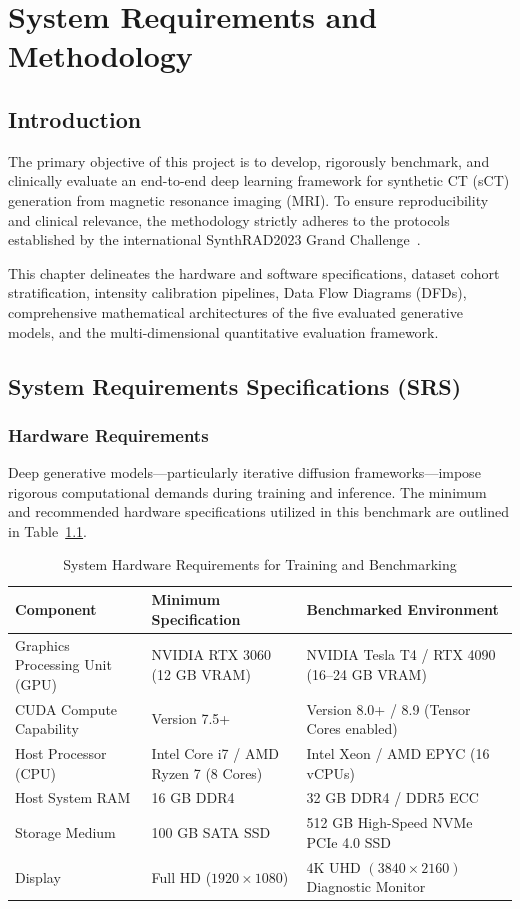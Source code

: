 \chapter{System Requirements and Methodology}

\section{Introduction}
The primary objective of this project is to develop, rigorously benchmark, and clinically evaluate an end-to-end deep learning framework for synthetic CT (sCT) generation from magnetic resonance imaging (MRI). To ensure reproducibility and clinical relevance, the methodology strictly adheres to the protocols established by the international SynthRAD2023 Grand Challenge~\cite{thummerer2023synthrad2023}. 

This chapter delineates the hardware and software specifications, dataset cohort stratification, intensity calibration pipelines, Data Flow Diagrams (DFDs), comprehensive mathematical architectures of the five evaluated generative models, and the multi-dimensional quantitative evaluation framework.

\section{System Requirements Specifications (SRS)}

\subsection{Hardware Requirements}
Deep generative models—particularly iterative diffusion frameworks—impose rigorous computational demands during training and inference. The minimum and recommended hardware specifications utilized in this benchmark are outlined in Table~\ref{tab:hardware_req}.

\begin{table}[htbp]
\centering
\caption{System Hardware Requirements for Training and Benchmarking}
\label{tab:hardware_req}
\small
\renewcommand{\arraystretch}{1.3}
\begin{tabularx}{\textwidth}{@{} l p{5.5cm} X @{}}
\toprule
\textbf{Component} & \textbf{Minimum Specification} & \textbf{Benchmarked Environment} \\
\midrule
Graphics Processing Unit (GPU) & NVIDIA RTX 3060 (12 GB VRAM) & NVIDIA Tesla T4 / RTX 4090 (16--24 GB VRAM) \\
CUDA Compute Capability & Version 7.5+ & Version 8.0+ / 8.9 (Tensor Cores enabled) \\
Host Processor (CPU) & Intel Core i7 / AMD Ryzen 7 (8 Cores) & Intel Xeon / AMD EPYC (16 vCPUs) \\
Host System RAM & 16 GB DDR4 & 32 GB DDR4 / DDR5 ECC \\
Storage Medium & 100 GB SATA SSD & 512 GB High-Speed NVMe PCIe 4.0 SSD \\
Display & Full HD ($1920 \times 1080$) & $4\text{K UHD } (3840 \times 2160)$ Diagnostic Monitor \\
\bottomrule
\end{tabularx}
\end{table}

